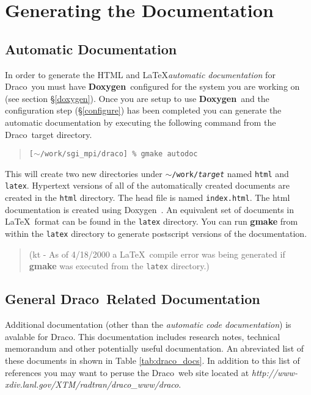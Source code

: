 \documentclass[11pt]{nmemo}
\newcommand{\comp}[1]{\normalfont\normalsize\texttt{#1}}
\newcommand{\draco}{{\normalfont\sffamily Draco}}
\newcommand{\doxygen}{{\normalfont\bfseries Doxygen}}
\begin{document}

\section{Generating the Documentation}

\subsection{Automatic Documentation}

In order to generate the HTML and \LaTeX \emph{automatic documentation} for
\draco\ you must have \doxygen\ configured for the system you are
working on (see section \S\ref{doxygen}).  Once you are setup to use
\doxygen\ and the configuration step (\S\ref{configure}) has been
completed you can generate the automatic documentation by executing the
following command from the \draco\ target directory.

\begin{verse}
\texttt{[$\sim$/work/sgi\_mpi/draco] \% gmake autodoc}
\end{verse}

This will create two new directories under
\comp{$\sim$/work/\emph{target}} named \comp{html} and \comp{latex}.
Hypertext versions of all of the automatically created documents are
created in the \comp{html} directory.  The head file is named
\comp{index.html}.  The html documentation is created using
Doxygen~\cite{doxygen}.  An equivalent set of documents in \LaTeX\ 
format can be found in the \comp{latex} directory.  You can run
\textbf{gmake} from within the \comp{latex} directory to generate
postscript versions of the documentation.  

\begin{verse}
(kt - As of 4/18/2000 a \LaTeX\ compile error was being generated if
\textbf{gmake} was executed from the \comp{latex} directory.)
\end{verse}

\subsection{General \draco\ Related Documentation}

Additional documentation (other than the \emph{automatic code
  documentation}) is avalable for \draco.  This documentation includes
research notes, technical memorandum and other potentially useful
documentation.  An abreviated list of these documents in shown in
Table \ref{tab:draco_docs}.  In addition to this list of references
you may want to peruse the \draco\ web site located at
\emph{http://www-xdiv.lanl.gov/XTM/radtran/draco\_www/draco}.
\end{document}
